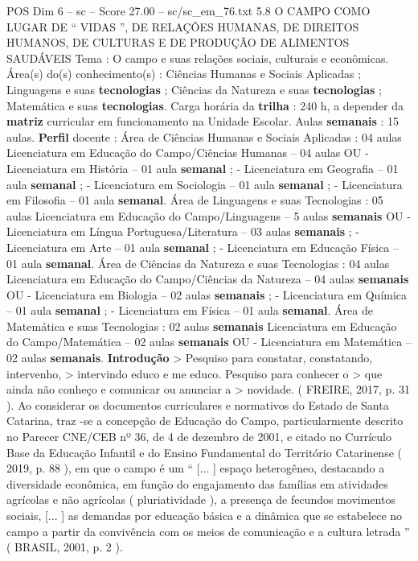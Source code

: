 \begin{textsample}{POS Dim 6 – sc – Score 27.00 – sc/sc\_em\_76.txt}  \label{ex:f6_pos_011}
5.8 O CAMPO COMO LUGAR DE “ VIDAS ”, DE RELAÇÕES HUMANAS, DE DIREITOS HUMANOS, DE CULTURAS E DE PRODUÇÃO DE ALIMENTOS SAUDÁVEIS Tema : O campo e suas relações sociais, culturais e econômicas.
Área(s) do(s) conhecimento(s) : Ciências Humanas e Sociais Aplicadas ; Linguagens e suas \textbf{tecnologias} ; Ciências da Natureza e suas \textbf{tecnologias} ; Matemática e suas \textbf{tecnologias}.
Carga horária da \textbf{trilha} : 240 h, a depender da \textbf{matriz} curricular em funcionamento na Unidade Escolar.
Aulas \textbf{semanais} : 15 aulas. \textbf{Perfil} docente : Área de Ciências Humanas e Sociais Aplicadas : 04 aulas Licenciatura em Educação do Campo/Ciências Humanas – 04 aulas OU - Licenciatura em História – 01 aula \textbf{semanal} ; - Licenciatura em Geografia – 01 aula \textbf{semanal} ; - Licenciatura em Sociologia – 01 aula \textbf{semanal} ; - Licenciatura em Filosofia – 01 aula \textbf{semanal}.
Área de Linguagens e suas Tecnologias : 05 aulas Licenciatura em Educação do Campo/Linguagens – 5 aulas \textbf{semanais} OU - Licenciatura em Língua Portuguesa/Literatura – 03 aulas \textbf{semanais} ; - Licenciatura em Arte – 01 aula \textbf{semanal} ; - Licenciatura em Educação Física – 01 aula \textbf{semanal}.
Área de Ciências da Natureza e suas Tecnologias : 04 aulas Licenciatura em Educação do Campo/Ciências da Natureza – 04 aulas \textbf{semanais} OU - Licenciatura em Biologia – 02 aulas \textbf{semanais} ; - Licenciatura em Química – 01 aula \textbf{semanal} ; - Licenciatura em Física – 01 aula \textbf{semanal}.
Área de Matemática e suas Tecnologias : 02 aulas \textbf{semanais} Licenciatura em Educação do Campo/Matemática – 02 aulas \textbf{semanais} OU - Licenciatura em Matemática – 02 aulas \textbf{semanais}. \textbf{Introdução} > Pesquiso para constatar, constatando, intervenho, > intervindo educo e me educo.
Pesquiso para conhecer o > que ainda não conheço e comunicar ou anunciar a > novidade. ( FREIRE, 2017, p. 31 ).
Ao considerar os documentos curriculares e normativos do Estado de Santa Catarina, traz -se a concepção de Educação do Campo, particularmente descrito no Parecer CNE/CEB nº 36, de 4 de dezembro de 2001, e citado no Currículo Base da Educação Infantil e do Ensino Fundamental do Território Catarinense ( 2019, p. 88 ), em que o campo é um “ [... ] espaço heterogêneo, destacando a diversidade econômica, em função do engajamento das famílias em atividades agrícolas e não agrícolas ( pluriatividade ), a presença de fecundos movimentos sociais, [... ] as demandas por educação básica e a dinâmica que se estabelece no campo a partir da convivência com os meios de comunicação e a cultura letrada ” ( BRASIL, 2001, p. 2 ).

\end{textsample}

